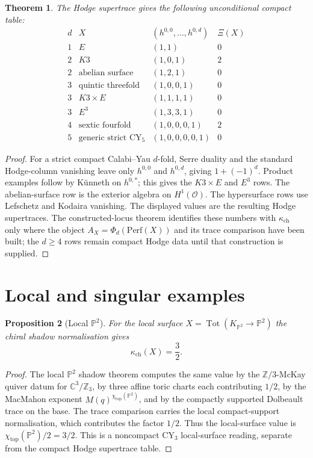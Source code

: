 \documentclass[11pt]{amsart}
\providecommand{\bC}{\mathbb{C}}
\providecommand{\bP}{\mathbb{P}}
\providecommand{\bZ}{\mathbb{Z}}
\providecommand{\cO}{\mathcal{O}}
\providecommand{\Tot}{\operatorname{Tot}}
\providecommand{\Perf}{\mathrm{Perf}}
\providecommand{\CY}{\mathrm{CY}}
\newtheorem{theorem}{Theorem}
\newtheorem{proposition}[theorem]{Proposition}
\theoremstyle{definition}
\theoremstyle{remark}
\begin{document}
\begin{theorem}
The Hodge supertrace gives the following unconditional compact table:
\[
\begin{array}{c|c|c|c}
d & X & (h^{0,0},\ldots,h^{0,d}) & \Xi(X)\\
\hline
1 & E & (1,1) & 0\\
2 & K3 & (1,0,1) & 2\\
2 & \text{abelian surface} & (1,2,1) & 0\\
3 & \text{quintic threefold} & (1,0,0,1) & 0\\
3 & K3\times E & (1,1,1,1) & 0\\
3 & E^3 & (1,3,3,1) & 0\\
4 & \text{sextic fourfold} & (1,0,0,0,1) & 2\\
5 & \text{generic strict }\CY_5 & (1,0,0,0,0,1) & 0
\end{array}
\]
\end{theorem}

\begin{proof}
For a strict compact Calabi--Yau \(d\)-fold, Serre duality and the standard
Hodge-column vanishing leave only \(h^{0,0}\) and \(h^{0,d}\), giving
\(1+(-1)^d\). Product examples follow by K\"unneth on \(h^{0,*}\); this gives
the \(K3\times E\) and \(E^3\) rows. The abelian-surface row is the exterior
algebra on \(H^1(\cO)\). The hypersurface rows use Lefschetz and Kodaira
vanishing. The displayed values are the resulting Hodge supertraces. The
constructed-locus theorem identifies these numbers with
\(\kappa_{\mathrm{ch}}\) only where the object \(A_X=\Phi_d(\Perf(X))\) and
its trace comparison have been built; the \(d\geq4\) rows remain compact
Hodge data until that construction is supplied.
\end{proof}

\section{Local and singular examples}

\begin{proposition}[Local \(\bP^2\)]
For the local surface \(X=\Tot(K_{\bP^2}\to \bP^2)\) the chiral shadow
normalisation gives
\[
        \kappa_{\mathrm{ch}}(X)=\frac32 .
\]
\end{proposition}

\begin{proof}
The local \(\bP^2\) shadow theorem computes the same value by the
\(\bZ/3\)-McKay quiver datum for \(\bC^3/\bZ_3\), by three affine toric
charts each contributing \(1/2\), by the MacMahon exponent
\(M(q)^{\chi_{\mathrm{top}}(\bP^2)}\), and by the compactly supported
Dolbeault trace on the base. The trace comparison carries the local
compact-support normalisation, which contributes the factor \(1/2\).
Thus the local-surface value is
\(\chi_{\mathrm{top}}(\bP^2)/2=3/2\). This is a noncompact \(\CY_3\)
local-surface reading, separate from the compact Hodge supertrace table.
\end{proof}
\end{document}

